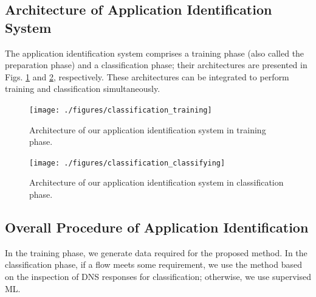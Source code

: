 \documentclass[journal]{IEEEtran}
\begin{document}
\subsection{Architecture of Application Identification System}
The application identification system comprises a training phase (also called the preparation phase) and a classification phase; their architectures are presented in Figs. \ref{fig:class_training} and \ref{fig:class_classifying}, respectively. These architectures can be integrated to perform training and classification simultaneously.

\begin{figure}[!t]
\centering
\texttt{[image: ./figures/classification\_training]}
\caption{Architecture of our application identification system in training phase.}
\label{fig:class_training}
\end{figure}

\begin{figure}[!t]
\centering
\texttt{[image: ./figures/classification\_classifying]}
\caption{Architecture of our application identification system in classification phase.}
\label{fig:class_classifying}
\end{figure}



\subsection{Overall Procedure of Application Identification}
In the training phase, we generate data required for the proposed method. In the classification phase, if a flow meets some requirement, we use the method based on the inspection of DNS responses for classification; otherwise, we use supervised ML.
\end{document}
